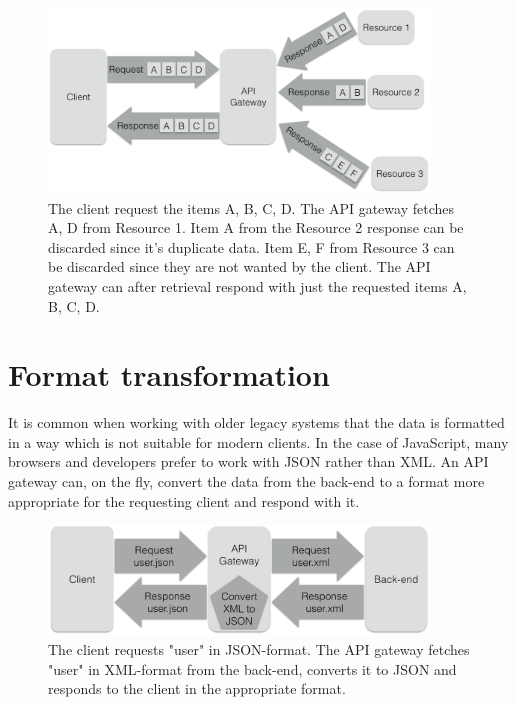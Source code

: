 \documentclass{cslthse-msc}
\begin{document}
\begin{figure}[H]
  \centering
    \begin{center}
      \includegraphics[width=0.9\textwidth]{images/api_gateway_duplicate.png}
    \end{center}
  \caption{The client request the items A, B, C, D. The API gateway fetches A, D from Resource 1. Item A from the Resource 2 response can be discarded since it's duplicate data. Item E, F from Resource 3 can be discarded since they are not wanted by the client. The API gateway can after retrieval respond with just the requested items A, B, C, D.}
\end{figure}

\section{Format transformation}
It is common when working with older legacy systems that the data is formatted in a way which is not suitable for modern clients. In the case of JavaScript, many browsers and developers prefer to work with JSON rather than XML. An API gateway can, on the fly, convert the data from the back-end to a format more appropriate for the requesting client and respond with it.

\begin{figure}[H]
  \centering
    \begin{center}
      \includegraphics[width=0.9\textwidth]{images/api_gateway_transform.png}
    \end{center}
  \caption{The client requests "user" in JSON-format. The API gateway fetches "user" in XML-format from the back-end, converts it to JSON and responds to the client in the appropriate format.}
\end{figure}
\end{document}
